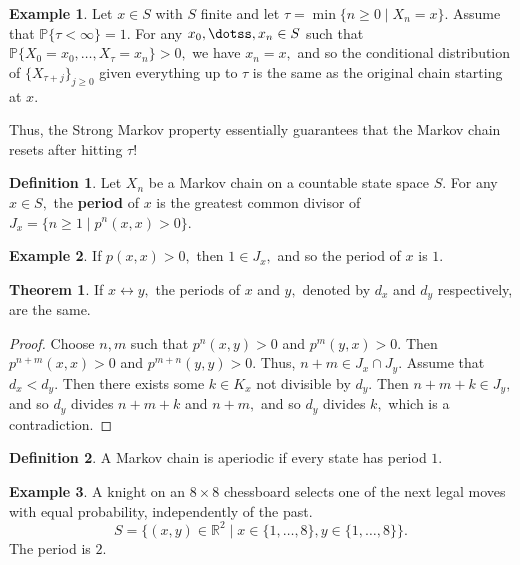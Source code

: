 \documentclass[10pt, oneside]{article}
\newcommand{\bbR}{\mathbb{R}}
\newcommand{\bbP}{\mathbb{P}}
\theoremstyle{definition}
\newtheorem{exmp}{Example}[section]
\newtheorem{thm}{Theorem}
\newtheorem{defn}{Definition}
\begin{document}
\begin{exmp}
    Let $x\in S$ with $S$ finite and let $\tau = \min\{n \geq 0 \mid X_n = x\}.$ Assume that $\bbP\{\tau < \infty\} = 1.$ For any $x_0, \dotss, x_n \in S$ such that 
    $\bbP\{X_0 = x_0, \dots, X_\tau = x_n\} >0,$ we have $x_n = x,$ and so the conditional distribution of $\{X_{\tau + j}\}_{j \geq 0}$ given everything up to $\tau$ is the same as the original chain starting at $x.$ 

    Thus, the Strong Markov property essentially guarantees that the Markov chain resets after hitting $\tau$!
\end{exmp}
    
\begin{defn}
    Let $X_n$ be a Markov chain on a countable state space $S.$ For any $x\in S,$ the \textbf{period} of $x$ is the greatest common divisor of $J_x = \{n \geq 1 \mid p^n(x,x) >0\}.$
\end{defn}
\begin{exmp}
    If $p(x,x) >0,$ then $1 \in J_x,$ and so the period of $x$ is $1.$
\end{exmp}

\begin{thm}
    If $x\leftrightarrow y,$ the periods of $x$ and $y,$ denoted by $d_x$ and $d_y$ respectively, are the same. 
\end{thm}
\begin{proof}
    Choose $n, m$ such that $p^n(x,y) >0$ and $p^m(y,x) >0.$ Then $p^{n +m}(x,x) >0$ and $p^{m + n}(y,y) >0.$ Thus, $ n + m \in J_x \cap J_y.$ Assume that $d_x < d_y.$ Then there exists some $k \in K_x$ not divisible by $d_y.$ Then $n + m + k \in J_y,$ and so $d_y$ divides $n + m + k$ and $n + m,$ and so $d_y$ divides $k,$ which is a contradiction.    
\end{proof}

\begin{defn}
    A Markov chain is aperiodic if every state has period $1.$
\end{defn}

\begin{exmp}
    A knight on an $8\times 8$ chessboard selects one of the next legal moves with equal probability, independently of the past. 
    \[S = \{(x,y) \in \bbR^2 \mid x \in \{1, \dots, 8\}, y \in \{1, \dots, 8\}\}.\]  The period is $2.$ 
\end{exmp}

\newpage
\end{document}

